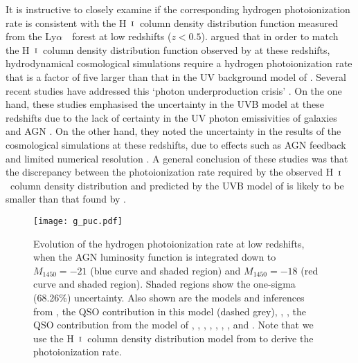 \documentclass[fleqn,usenatbib]{mnras}
\def\lya{Ly$\alpha$~}
\def\HI{\hbox{H~$\scriptstyle\rm I$}}
\begin{document}
It is instructive to closely examine if the corresponding hydrogen
photoionization rate is consistent with the \HI\ column density
distribution function measured from the \lya\ forest
\citep{2016ApJ...817..111D} at low redshifts ($z<0.5$).
\citet{2014ApJ...789L..32K} argued that in order to match the
\HI\ column density distribution function observed by
\citet{2016ApJ...817..111D} at these redshifts, hydrodynamical
cosmological simulations require a hydrogen photoionization rate that
is a factor of five larger than that in the UV background model of
\citet{2012ApJ...746..125H}.  Several recent studies have addressed
this `photon underproduction crisis' \citep{2015MNRAS.451L..30K,
  2015ApJ...811....3S, 2017MNRAS.467.3172G, 2017MNRAS.467.4802F,
  2017MNRAS.466..838G, 2017MNRAS.467L..86V}.  On the one hand, these
studies emphasised the uncertainty in the \citet{2012ApJ...746..125H}
UVB model at these redshifts due to the lack of certainty in the UV
photon emissivities of galaxies and AGN \citep{2015MNRAS.451L..30K,
  2015ApJ...811....3S}.  On the other hand, they noted the uncertainty
in the results of the cosmological simulations at these redshifts, due
to effects such as AGN feedback and limited numerical resolution
\citep{2015ApJ...811....3S, 2017MNRAS.467L..86V, 2017MNRAS.471.1056N,
  2017ApJ...837..106O, 2017MNRAS.466..838G, 2017MNRAS.467.3172G,
  2017ApJ...835..175G}.  A general conclusion of these studies was
that the discrepancy between the photoionization rate required by the
observed \HI\ column density distribution and predicted by the UVB
model of \citet{2012ApJ...746..125H} is likely to be smaller than that
found by \citet{2014ApJ...789L..32K}.

\begin{figure}
  \begin{center}
    \texttt{[image: g\_puc.pdf]}
  \end{center}
  \caption{Evolution of the hydrogen photoionization rate at low
    redshifts, when the AGN luminosity function is integrated down to
    $M_{1450}=-21$ (blue curve and shaded region) and $M_{1450}=-18$
    (red curve and shaded region).  Shaded regions show the one-sigma
    (68.26\%) uncertainty.  Also shown are the models and inferences
    from \citet[dotted brown curve]{2012ApJ...746..125H}, the QSO
    contribution in this model (dashed grey), \citet[dotted
      green]{2015ApJ...813L...8M}, \citet[dashed
      black]{2015ApJ...811....3S}, the QSO contribution from the model
    of \citet[dashed orange]{2015MNRAS.451L..30K}, \citet[dotted
      grey]{2017ApJ...837..106O}, \citet[dashed
      brown]{2018arXiv180104931P}, \citet[yellow
      box]{2017MNRAS.467.4802F}, \citet[black
      box]{2017MNRAS.467L..86V}, \citet[inverted
      triangle]{2013MNRAS.436.1023B},
    \citet[pentagon]{2014ApJ...789L..32K}, and
    \citet[circle]{2017MNRAS.467.3172G}. Note that we use the 
    \HI\ column density distribution model from
    \citet{2012ApJ...746..125H} to derive the photoionization rate.
    \label{fig:puc}}
\end{figure}
\end{document}
